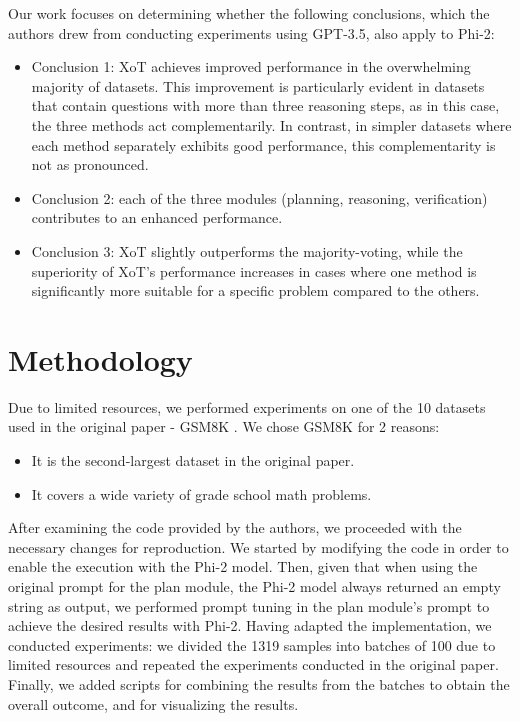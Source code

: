 \documentclass[10pt]{article} %
\begin{document}
Our work focuses on determining whether the following conclusions, which the authors drew from conducting experiments using GPT-3.5, also apply to Phi-2:

\begin{itemize}  
  \item Conclusion 1: XoT achieves improved performance in the overwhelming majority of datasets. This improvement is particularly evident in datasets that contain questions with more than three reasoning steps, as in this case, the three methods act complementarily. In contrast, in simpler datasets where each method separately exhibits good performance, this complementarity is not as pronounced.
  \item Conclusion 2: each of the three modules (planning, reasoning, verification) contributes to an enhanced performance.
  \item Conclusion 3: XoT slightly outperforms the majority-voting, while the superiority of XoT's performance increases in cases where one method is significantly more suitable for a specific problem compared to the others.
\end{itemize}

\section{Methodology}
\label{headings}

Due to limited resources, we performed experiments on one of the 10 datasets used in the original paper - GSM8K \citep{cobbe2021training}. We chose GSM8K for 2 reasons:

\begin{itemize}  
  \item It is the second-largest dataset in the original paper.
  \item It covers a wide variety of grade school math problems.
\end{itemize}

After examining the code provided by the authors, we proceeded with the necessary changes for reproduction. We started by modifying the code in order to enable the execution with the Phi-2 model. Then, given that when using the original prompt for the plan module, the Phi-2 model always returned an empty string as output, we performed prompt tuning in the plan module's prompt to achieve the desired results with Phi-2. Having adapted the implementation, we conducted experiments: we divided the 1319 samples into batches of 100 due to limited resources and repeated the experiments conducted in the original paper. Finally, we added scripts for combining the results from the batches to obtain the overall outcome, and for visualizing the results.
\end{document}
